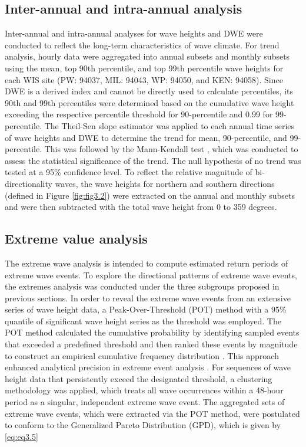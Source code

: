 \subsection{Inter-annual and intra-annual analysis}
\label{c3_Inter-annual and intra-annual analysis}

Inter-annual and intra-annual analyses for wave heights and DWE were conducted
to reflect the long-term characteristics of wave climate. For trend analysis,
hourly data were aggregated into annual subsets and monthly subsets using the
mean, top 90th percentile, and top 99th percentile wave heights for each WIS
site (PW: 94037, MIL: 94043, WP: 94050, and KEN: 94058). Since DWE is a derived
index and cannot be directly used to calculate percentiles, its 90th and 99th
percentiles were determined based on the cumulative wave height exceeding the
respective percentile threshold for 90-percentile and 0.99 for 99-percentile.
The Theil-Sen slope estimator was applied to each annual time series of wave
heights and DWE to determine the trend for mean, 90-percentile, and
99-percentile. This was followed by the Mann-Kendall test
\citep{kendall_new_1938,mann_nonparametric_1945}, which was conducted to assess
the statistical significance of the trend. The null hypothesis of no trend was
tested at a 95\% confidence level. To reflect the relative magnitude of
bi-directionality waves, the wave heights for northern and southern directions
(defined in Figure \ref{fig:fig3.2}) were extracted on the annual and monthly
subsets and were then subtracted with the total wave height from 0 to 359
degrees.

\subsection{Extreme value analysis}
\label{c3_Extreme value analysis}

The extreme wave analysis is intended to compute estimated return periods of
extreme wave events. To explore the directional patterns of extreme wave events,
the extremes analysis was conducted under the three subgroups proposed in
previous sections. In order to reveal the extreme wave events from an extensive
series of wave height data, a Peak-Over-Threshold (POT) method with a 95\%
quantile of significant wave height series as the threshold was employed. The
POT method calculated the cumulative probability by identifying sampled events
that exceeded a predefined threshold and then ranked these events by magnitude
to construct an empirical cumulative frequency distribution
\citep{bechle_meteotsunami_2015}. This approach enhanced analytical precision in
extreme event analysis \citep{coles_introduction_2001}. For sequences of wave
height data that persistently exceed the designated threshold, a clustering
methodology was applied, which treats all wave occurrences within a 48-hour
period as a singular, independent extreme wave event. The aggregated sets of
extreme wave events, which were extracted via the POT method, were postulated to
conform to the Generalized Pareto Distribution (GPD), which is given by
\ref{eq:eq3.5}

